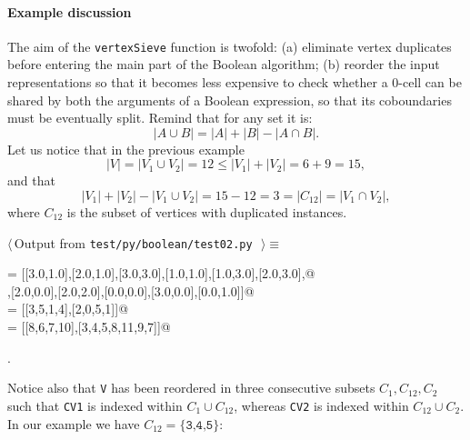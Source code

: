 \documentclass[11pt,oneside]{article}	%
\begin{document}
\paragraph{Example discussion} 
The aim of the \texttt{vertexSieve} function is twofold: (a) eliminate vertex duplicates before entering the main part of the Boolean algorithm; (b) reorder the input representations so that it becomes less expensive to check whether a 0-cell can be shared by both the arguments of a Boolean expression, so that its coboundaries must be eventually split. Remind that for any set it is:
\[
|A\cup B| = |A|+|B|-|A\cap B|.
\]
Let us notice that in the previous example
\[
|V| = |V_1 \cup V_2| = 12 \leq |V_1|+|V_2| = 6+9 = 15,
\]
and that 
\[
|V_1|+|V_2| - |V_1 \cup V_2| = 15 - 12 = 3 = |C_{12}| = |V_1 \cap V_2|,
\]
where $C_{12}$ is the subset of vertices with duplicated instances.
\begin{flushleft} \small \label{scrap10}
$\langle\,$Output from \texttt{test/py/boolean/test02.py}\nobreak\ {\footnotesize {}}$\,\rangle\equiv$
\vspace{-1ex}
\begin{list}{}{} \item
\mbox{}\verb@V   = [[3.0,1.0],[2.0,1.0],[3.0,3.0],[1.0,1.0],[1.0,3.0],[2.0,3.0],@\\
\mbox{}\verb@       [3.0,2.0],[2.0,0.0],[2.0,2.0],[0.0,0.0],[3.0,0.0],[0.0,1.0]]@\\
\mbox{} = [[3,5,1,4],[2,0,5,1]]@\\
\mbox{} = [[8,6,7,10],[3,4,5,8,11,9,7]]@\\
\mbox{}\verb@@{\NWsep}
\end{list}
\vspace{-1ex}
\footnotesize\addtolength{\baselineskip}{-1ex}
\begin{list}{}{\setlength{\itemsep}{-\parsep}\setlength{\itemindent}{-\leftmargin}}
\item {\NWtxtMacroNoRef}.
\end{list}
\end{flushleft}
Notice also that \texttt{V} has been reordered in three consecutive subsets $C_{1},C_{12},C_{2}$ such that \texttt{CV1} is indexed within $C_{1}\cup C_{12}$, whereas \texttt{CV2} is indexed within $C_{12}\cup C_{2}$. In our example we have  $C_{12}=\{\texttt{3,4,5}\}$: 
\end{document}
